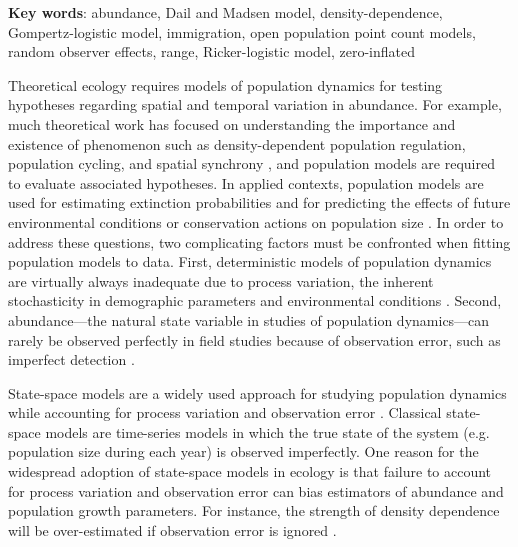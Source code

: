 \documentclass[12pt]{article}
\begin{document}
\vspace{0.5cm}

\textbf{Key words}: abundance, Dail and Madsen model, density-dependence,
Gompertz-logistic model, immigration, open population point count models,
random observer effects, range, Ricker-logistic model, zero-inflated

\newpage

Theoretical ecology requires models of population dynamics for testing
hypotheses regarding spatial and temporal variation in
abundance. For example, much theoretical work has focused on
understanding the importance and existence of phenomenon such as
density-dependent population regulation, population cycling, and spatial synchrony
\citep{may:1975,royama:1977,turchin:1990,dennis_taper:1994,bjornstad_etal:1999},
and population models are required to evaluate associated hypotheses.
In applied contexts, population models are used for estimating extinction probabilities
\citep{schoener_spiller:1992,nadeem_lele:2011,hostetler_etal:2012} and for predicting the
effects of future environmental conditions or conservation actions on
population size \citep{jamieson_brooks:2004,hatfield_etal:2012}.
In order to address these questions, two complicating factors must
be confronted when fitting population models to data. 
First, deterministic models of population dynamics are virtually always inadequate due to process
variation, the inherent stochasticity in demographic parameters and environmental
conditions \citep{bjornstad_grenfell:2001,saether_engen:2002}.
Second, abundance---the natural state variable in studies
of population dynamics---can rarely be observed perfectly in field
studies because of observation error, such as imperfect
detection \citep{link_nichols:1994,kery_etal:2009}.

State-space models are a widely used approach for
studying population dynamics while accounting for process variation
and observation error \citep{devalpine_hastings:2002,
  buckland_etal:2004, dennis_etal:2006}. Classical state-space
models are time-series models in which the true state of the
system (e.g. population size during each year) is observed
imperfectly. One reason for the widespread adoption of
state-space models in ecology is that failure to account for process
variation and observation error can bias estimators of abundance and
population growth parameters. For instance, the strength of
density dependence will be over-estimated if observation error is
ignored \citep{link_nichols:1994,shenk_etal:1998}.
\end{document}
